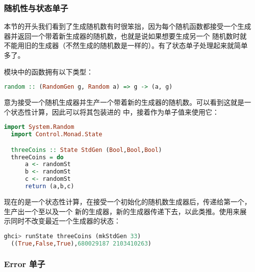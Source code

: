 \documentclass[./main.tex]{subfiles}
\begin{document}
\subsubsection*{随机性与状态单子}

本节的开头我们看到了生成随机数有时很笨拙，因为每个随机函数都接受一个生成器并返回一个带着新生成器的随机数，也就是说如果想要生成另一个
随机数时就不能用旧的生成器（不然生成的随机数是一样的）。有了状态单子处理起来就简单多了。

模块中的函数拥有以下类型：

\begin{lstlisting}[language=Haskell]
  random :: (RandomGen g, Random a) => g -> (a, g)
\end{lstlisting}

意为接受一个随机生成器并生产一个带着新的生成器的随机数。可以看到这就是一个状态性计算，因此可以将其包装进的
中，接着作为单子值来使用它：

\begin{lstlisting}[language=Haskell]
  import System.Random
  import Control.Monad.State

  threeCoins :: State StdGen (Bool,Bool,Bool)
  threeCoins = do
      a <- randomSt
      b <- randomSt
      c <- randomSt
      return (a,b,c)
\end{lstlisting}

现在的是一个状态性计算，在接受一个初始化的随机数生成器后，传递给第一个，生产出一个至以及一个
新的生成器，新的生成器传递下去，以此类推。使用来展示同时不改变最近一个生成器的状态：

\begin{lstlisting}[language=Haskell]
  ghci> runState threeCoins (mkStdGen 33)
  ((True,False,True),680029187 2103410263)
\end{lstlisting}

\subsubsection*{Error 单子}

\end{document}
